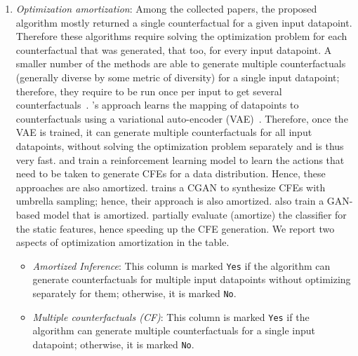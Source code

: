 \begin{enumerate}[leftmargin=*]
    \item \emph{Optimization amortization}:  
    Among the collected papers, the proposed algorithm mostly returned a single counterfactual for a given input datapoint.
    Therefore these algorithms require solving the optimization problem for each counterfactual that was generated, that too, for every input datapoint. 
    A smaller number of the methods are able to generate multiple counterfactuals (generally diverse by some metric of diversity) for a single input datapoint; therefore, they require to be run once per input to get several counterfactuals~\citep{guidotti_local_2018,russell_efficient_2019,sharma_certifai_2019,mothilal_explaining_2020,mahajan_preserving_2020,karimi_model-agnostic_2020,dandl_multi-objective_2020,fernandez-random:2020,oblique-tree-cfe}. 
    \citet{mahajan_preserving_2020}'s approach learns the mapping of datapoints to counterfactuals using a variational auto-encoder (VAE)~\citep{doersch-autoencoder}. 
    Therefore, once the VAE is trained, it can generate multiple counterfactuals for all input datapoints, without solving the optimization problem separately and is thus very fast. 
    \citet{verma2021amortized} and \citet{rl_cfe_approach2_amortized} train a reinforcement learning model to learn the actions that need to be taken to generate CFEs for a data distribution. Hence, these approaches are also amortized. 
    \citep{gan_cfe_amortized} trains a CGAN to synthesize CFEs with umbrella sampling; hence, their approach is also amortized. \citet{conditional_gan_cfe_looveren} also train a GAN-based model that is amortized. 
    \citet{schleich2021geco} partially evaluate (amortize) the classifier for the static features, hence speeding up the CFE generation. 
    We report two aspects of optimization amortization in the table. 
    \begin{itemize}%
        \item  \emph{Amortized Inference}: This column is marked \texttt{Yes} if the algorithm can generate counterfactuals for multiple input datapoints without optimizing separately for them; otherwise, it is marked \texttt{No}. 
        \item  \emph{Multiple counterfactuals (CF)}: This column is marked \texttt{Yes} if the algorithm can generate multiple counterfactuals for a single input datapoint; otherwise, it is marked \texttt{No}. 
    \end{itemize}


\end{enumerate}
